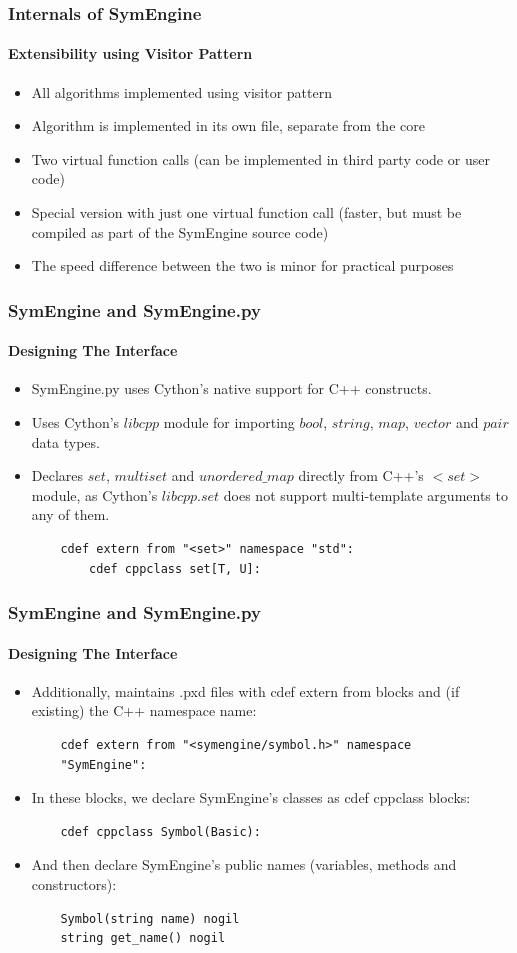 \documentclass{beamer}
\begin{document}
\begin{frame}
\frametitle{Internals of SymEngine}
\framesubtitle{Extensibility using Visitor Pattern}
\begin{itemize}
    \item All algorithms implemented using visitor pattern
    \item Algorithm is implemented in its own file, separate from the core
    \item Two virtual function calls (can be implemented in third party code or
        user code)
    \item Special version with just one virtual function call (faster, but must
        be compiled as part of the SymEngine source code)
    \item The speed difference between the two is minor for practical purposes
\end{itemize}
\end{frame}


\begin{frame}[fragile]
\frametitle{SymEngine and SymEngine.py}
\framesubtitle{Designing The Interface}
\begin{itemize}
    \item SymEngine.py uses Cython's native support for C++ constructs.
    \item Uses Cython's $libcpp$ module for importing $bool$, $string$, $map$,
        $vector$ and $pair$ data types.
    \item Declares $set$, $multiset$ and $unordered\_map$ directly from C++'s 
        $<set>$ module, as Cython's $libcpp.set$ does not support multi-template 
        arguments to any of them.
    \begin{verbatim}
    cdef extern from "<set>" namespace "std":
        cdef cppclass set[T, U]:
    \end{verbatim}
\end{itemize}
\end{frame}


\begin{frame}[fragile]
\frametitle{SymEngine and SymEngine.py}
\framesubtitle{Designing The Interface}
\begin{itemize}
    \item Additionally, maintains .pxd files with cdef extern from blocks and (if existing)
        the C++ namespace name:
    \begin{verbatim}
    cdef extern from "<symengine/symbol.h>" namespace 
    "SymEngine":
    \end{verbatim}
\item In these blocks, we declare SymEngine's classes as cdef cppclass blocks:
    \begin{verbatim}
    cdef cppclass Symbol(Basic):
    \end{verbatim}
\item And then declare SymEngine's public names (variables, methods and constructors):
    \begin{verbatim}
    Symbol(string name) nogil
    string get_name() nogil
    \end{verbatim}
\end{itemize}
\end{frame}
\end{document}
